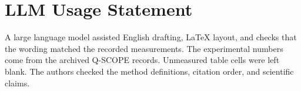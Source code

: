 \section*{LLM Usage Statement}
A large language model assisted English drafting, LaTeX layout, and checks that the wording matched the recorded measurements.
The experimental numbers come from the archived Q-SCOPE records. Unmeasured table cells were left blank.
The authors checked the method definitions, citation order, and scientific claims.
